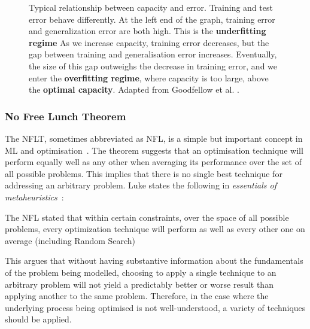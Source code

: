 \begin{figure}[htp]
    \centering
    
    \captionsetup{format=hang} %
    \caption{
        Typical relationship between capacity and error. Training and test error
        behave differently. At the left end of the graph, training error and
        generalization error are both high. This is the \textbf{underfitting
        regime} As we increase capacity, training error decreases, but the gap
        between training and generalisation error increases. Eventually, the
        size of this gap outweighs the decrease in training error, and we enter
        the \textbf{overfitting regime}, where capacity is too large, above the
        \textbf{optimal capacity}. Adapted from Goodfellow et al.
        \cite{Goodfellow-et-al-2016}.
    }
    \label{fig:capacity}
\end{figure}

\subsubsection{No Free Lunch Theorem}

The \gls{NFLT}, sometimes abbreviated as \gls{NFL}, is a simple but important
concept in \gls{ML} and optimisation~\cite{Wolpert1997}. The theorem suggests
that an optimisation technique will perform equally well as any other when
averaging its performance over the set of all possible problems. This implies
that there is no single best technique for addressing an arbitrary problem. Luke
states the following in \textit{essentials of
metaheuristics}~\cite{luke2012essentials}:

\begin{fancyquotes}
    The \gls{NFL} stated that within certain constraints, over the space of
    all possible problems, every optimization technique will perform as well as
    every other one on average (including Random Search)
\end{fancyquotes}

This argues that without having substantive information about the fundamentals
of the problem being modelled, choosing to apply a single technique to an
arbitrary problem will not yield a predictably better or worse result than
applying another to the same problem. Therefore, in the case where the
underlying process being optimised is not well-understood, a variety of
techniques should be applied.


